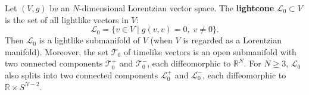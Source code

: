 Let $(V, g)$ be an $N$-dimensional Lorentzian vector space. The \textbf{lightcone} $\mathcal{L}_0 \subset V$ is the set of all lightlike vectors in $V$:
$$\mathcal{L}_0 = \{v \in V \mid g(v, v) = 0,\; v \neq 0\}.$$
Then $\mathcal{L}_0$ is a lightlike submanifold of $V$ (when $V$ is regarded as a Lorentzian manifold). Moreover, the set $\mathcal{T}_0$ of timelike vectors is an open submanifold with two connected components $\mathcal{T}_0^+$ and $\mathcal{T}_0^-$, each diffeomorphic to $\mathbb{R}^N$. For $N \geq 3$, $\mathcal{L}_0$ also splits into two connected components $\mathcal{L}_0^+$ and $\mathcal{L}_0^-$, each diffeomorphic to $\mathbb{R} \times S^{N-2}$.
